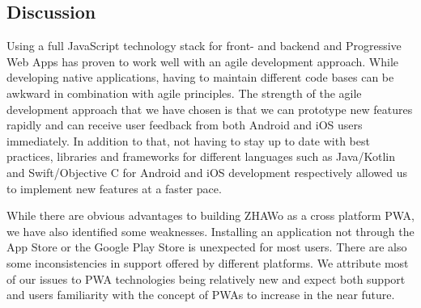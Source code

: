 \begin{markdown}
\section{Discussion} \label{discussion}

Using a full JavaScript technology stack for front- and backend and Progressive Web Apps has proven to work well with an agile development approach. While developing native applications, having to maintain different code bases can be awkward in combination with agile principles. The strength of the agile development approach that we have chosen is that we can prototype new features rapidly and can receive user feedback from both Android and iOS users immediately. In addition to that, not having to stay up to date with best practices, libraries and frameworks for different languages such as Java/Kotlin and Swift/Objective C for Android and iOS development respectively allowed us to implement new features at a faster pace.

While there are obvious advantages to building ZHAWo as a cross platform PWA, we have also identified some weaknesses. Installing an application not through the App Store or the Google Play Store is unexpected for most users. There are also some inconsistencies in support offered by different platforms. We attribute most of our issues to PWA technologies being relatively new and expect both support and users familiarity with the concept of PWAs to increase in the near future.

\end{markdown}

